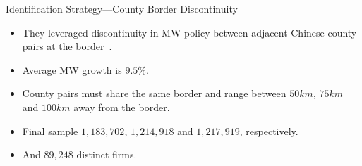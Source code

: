 \documentclass[aspectratio = 169]{beamer}
\begin{document}
    \begin{frame}{Identification Strategy---County Border Discontinuity}
        \begin{itemize}
            \item They leveraged discontinuity in MW policy between adjacent Chinese county pairs at the border~\parencite{dube2010minimum}.
            \item Average MW growth is $9.5\%$.
            \item County pairs must share the same border and range between $50km$, $75km$ and $100km$ away from the border.
            \item Final sample $1,183,702$, $1,214,918$ and $1,217,919$, respectively.
            \item And $89,248$ distinct firms.
        \end{itemize}

    \end{frame}
\end{document}

